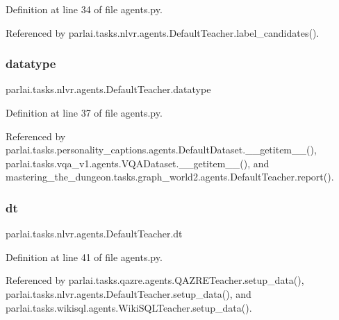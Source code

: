 Definition at line 34 of file agents.\+py.



Referenced by parlai.\+tasks.\+nlvr.\+agents.\+Default\+Teacher.\+label\+\_\+candidates().

\mbox{\label{classparlai_1_1tasks_1_1nlvr_1_1agents_1_1DefaultTeacher_a0d82ff42ca2bdc37d2cc0dde80dc67ef}} 
\subsubsection{\texorpdfstring{datatype}{datatype}}
{\footnotesize\ttfamily parlai.\+tasks.\+nlvr.\+agents.\+Default\+Teacher.\+datatype}



Definition at line 37 of file agents.\+py.



Referenced by parlai.\+tasks.\+personality\+\_\+captions.\+agents.\+Default\+Dataset.\+\_\+\+\_\+getitem\+\_\+\+\_\+(), parlai.\+tasks.\+vqa\+\_\+v1.\+agents.\+V\+Q\+A\+Dataset.\+\_\+\+\_\+getitem\+\_\+\+\_\+(), and mastering\+\_\+the\+\_\+dungeon.\+tasks.\+graph\+\_\+world2.\+agents.\+Default\+Teacher.\+report().

\mbox{\label{classparlai_1_1tasks_1_1nlvr_1_1agents_1_1DefaultTeacher_a6473aea8efc0cffb97b718bb024207ac}} 
\subsubsection{\texorpdfstring{dt}{dt}}
{\footnotesize\ttfamily parlai.\+tasks.\+nlvr.\+agents.\+Default\+Teacher.\+dt}



Definition at line 41 of file agents.\+py.



Referenced by parlai.\+tasks.\+qazre.\+agents.\+Q\+A\+Z\+R\+E\+Teacher.\+setup\+\_\+data(), parlai.\+tasks.\+nlvr.\+agents.\+Default\+Teacher.\+setup\+\_\+data(), and parlai.\+tasks.\+wikisql.\+agents.\+Wiki\+S\+Q\+L\+Teacher.\+setup\+\_\+data().

